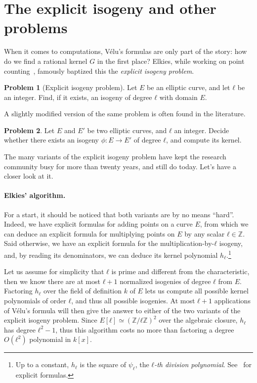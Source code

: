 \documentclass{report}
\theoremstyle{plain}
\theoremstyle{definition}
\newtheorem{problem}{Problem}
\begin{document}

\section{The explicit isogeny and other problems}

When it comes to computations, Vélu's formulas are only part of the
story: how do we find a rational kernel $G$ in the first place?
Elkies, while working on point counting~\cite{elkies92,elkies98},
famously baptized this the \emph{explicit isogeny problem}.

\begin{problem}[Explicit isogeny problem]
  \label{prob:expl-isog}
  Let $E$ be an elliptic curve, and let $ℓ$ be an integer. %
  Find, if it exists, an isogeny of degree $ℓ$ with domain $E$.
\end{problem}

A slightly modified version of the same problem is often found in the
literature.

\begin{problem}
  \label{prob:expl-isog-2}
  Let $E$ and $E'$ be two elliptic curves, and $ℓ$ an integer. %
  Decide whether there exists an isogeny $ϕ:E→ E'$ of degree $ℓ$,
  and compute its kernel.
\end{problem}

The many variants of the explicit isogeny problem have kept the
research community busy for more than twenty years, and still do
today. %
Let's have a closer look at it. %

\paragraph{Elkies' algorithm.}
For a start, it should be noticed that both variants are by no means
``hard''. %
Indeed, we have explicit formulas for adding points on a curve $E$,
from which we can deduce an explicit formula for multiplying points on
$E$ by any scalar $ℓ∈ℤ$. %
Said otherwise, we have an explicit formula for the
multiplication-by-$ℓ$ isogeny, and, by reading its denominators, we
can deduce its kernel polynomial $h_ℓ$.\footnote{Up to a constant,
  $h_ℓ$ is the square of $ψ_ℓ$, the \emph{$ℓ$-th division polynomial}.
  See~\cite[III.4]{blake+seroussi+smart} for explicit formulas.} %

Let us assume for simplicity that $ℓ$ is prime and different from the
characteristic, then we know there are at most $ℓ+1$ normalized
isogenies of degree $ℓ$ from $E$. %
Factoring $h_ℓ$ over the field of definition $k$ of $E$ lets us
compute all possible kernel polynomials of order $ℓ$, and thus all
possible isogenies. %
At most $ℓ+1$ applications of Vélu's formula will then give the answer
to either of the two variants of the explicit isogeny problem. %
Since $E[ℓ]≃(ℤ/ℓℤ)^2$ over the algebraic closure, $h_ℓ$ has degree
$ℓ^2-1$, thus this algorithm costs no more than factoring a degree
$O(ℓ^2)$ polynomial in $k[x]$. %
\end{document}
